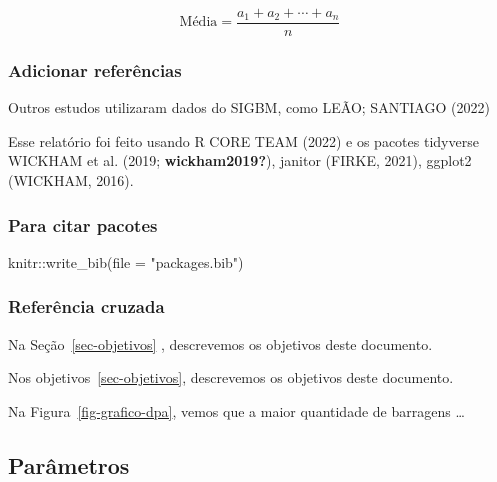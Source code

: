 \documentclass[
  letterpaper,
  DIV=11,
  numbers=noendperiod]{scrartcl}
\newenvironment{Shaded}{\begin{snugshade}}{\end{snugshade}}
\newcommand{\AttributeTok}[1]{\textcolor[rgb]{0.40,0.45,0.13}{#1}}
\newcommand{\FunctionTok}[1]{\textcolor[rgb]{0.28,0.35,0.67}{#1}}
\newcommand{\NormalTok}[1]{\textcolor[rgb]{0.00,0.23,0.31}{#1}}
\newcommand{\SpecialCharTok}[1]{\textcolor[rgb]{0.37,0.37,0.37}{#1}}
\newcommand{\StringTok}[1]{\textcolor[rgb]{0.13,0.47,0.30}{#1}}
\begin{document}
\[{\text{Média}=\frac {a_{1}+a_{2}+\cdots +a_{n}}{n}}\]

\hypertarget{adicionar-referuxeancias}{%
\subsubsection{Adicionar referências}\label{adicionar-referuxeancias}}

Outros estudos utilizaram dados do SIGBM, como LEÃO; SANTIAGO (2022)

Esse relatório foi feito usando R CORE TEAM (2022) e os pacotes
tidyverse WICKHAM et al. (2019; \textbf{wickham2019?}), janitor (FIRKE,
2021), ggplot2 (WICKHAM, 2016).

\hypertarget{para-citar-pacotes}{%
\subsubsection{Para citar pacotes}\label{para-citar-pacotes}}

\begin{Shaded}
\begin{Highlighting}[]
\NormalTok{knitr}\SpecialCharTok{::}\FunctionTok{write\_bib}\NormalTok{(}\AttributeTok{file =} \StringTok{"packages.bib"}\NormalTok{)}
\end{Highlighting}
\end{Shaded}

\hypertarget{referuxeancia-cruzada}{%
\subsubsection{Referência cruzada}\label{referuxeancia-cruzada}}

Na Seção~\ref{sec-objetivos} , descrevemos os objetivos deste documento.

Nos objetivos~\ref{sec-objetivos}, descrevemos os objetivos deste
documento.

Na Figura~\ref{fig-grafico-dpa}, vemos que a maior quantidade de
barragens \ldots{}

\hypertarget{paruxe2metros}{%
\subsection{Parâmetros}\label{paruxe2metros}}

\begin{Shaded}
\end{Shaded}
\end{document}
